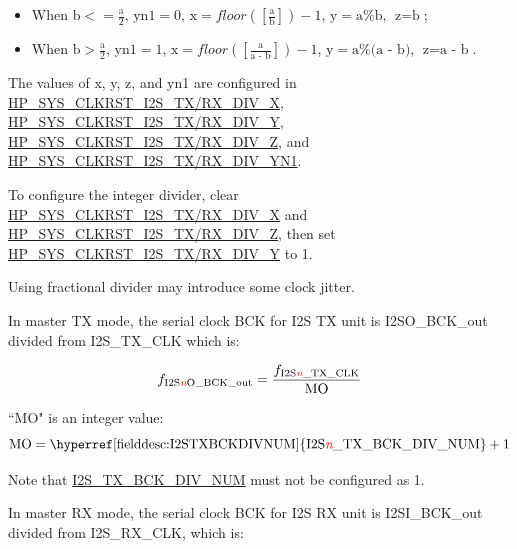 \documentclass[main\_\_EN.tex]{subfiles}
\begin{document}
\begin{itemize}
    \item When $\textrm{b} <= \frac{\textrm{a}}{2}$, $\textrm{yn1} = 0$, $\textrm{x} = floor([\frac{\textrm{a}}{\textrm{b}}]) - 1$, $\textrm{y} = \textrm{a}\%\textrm{b}$, $\textrm{z} = \textrm{b}$; 
    \item When $\textrm{b} > \frac{\textrm{a}}{2}$, $\textrm{yn1}=1$, $\textrm{x} = floor([\frac{\textrm{a}}{\textrm{a - b}}]) - 1$, $\textrm{y} = \textrm{a}\%\textrm{(a - b)}$, $\textrm{z}=\textrm{a - b}$.
\end{itemize}

The values of x, y, z, and yn1 are configured in \hyperref[fielddesc:HPSYSCLKRSTI2S0TXDIVX]{HP\_SYS\_CLKRST\_I2S\_TX/RX\_DIV\_X}, \hyperref[fielddesc:HPSYSCLKRSTI2S0TXDIVY]{HP\_SYS\_CLKRST\_I2S\_TX/RX\_DIV\_Y}, \hyperref[fielddesc:HPSYSCLKRSTI2S0TXDIVZ]{HP\_SYS\_CLKRST\_I2S\_TX/RX\_DIV\_Z}, and \hyperref[fielddesc:HPSYSCLKRSTI2S0TXDIVYN1]{HP\_SYS\_CLKRST\_I2S\_TX/RX\_DIV\_YN1}.

To configure the integer divider, clear \hyperref[fielddesc:HPSYSCLKRSTI2S0TXDIVX]{HP\_SYS\_CLKRST\_I2S\_TX/RX\_DIV\_X} and \hyperref[fielddesc:HPSYSCLKRSTI2S0TXDIVZ]{HP\_SYS\_CLKRST\_I2S\_TX/RX\_DIV\_Z}, then set \hyperref[fielddesc:HPSYSCLKRSTI2S0TXDIVY]{HP\_SYS\_CLKRST\_I2S\_TX/RX\_DIV\_Y} to 1.

\begin{tiplisting}
Using fractional divider may introduce some clock jitter.
\end{tiplisting}

In master TX mode, the serial clock BCK for I2S TX unit is I2SO\_BCK\_out divided from I2S\_TX\_CLK which is:

$$f_{\textrm{I2S\textcolor{red}{\it{n}}O\_BCK\_out}} = \frac{f_{\textrm{I2S\textcolor{red}{\it{n}}\_TX\_CLK}}}{\textrm{MO}}$$

``MO" is an integer value:
$$ \textrm{MO} = \textrm{\hyperref[fielddesc:I2STXBCKDIVNUM]{I2S\regindex{n}\_TX\_BCK\_DIV\_NUM}} + 1 $$

\vspace{-1em}
\begin{tiplisting}
Note that \hyperref[fielddesc:I2STXBCKDIVNUM]{I2S\_TX\_BCK\_DIV\_NUM} must not be configured as 1.
\end{tiplisting}

In master RX mode, the serial clock BCK for I2S RX unit is I2SI\_BCK\_out divided from I2S\_RX\_CLK, which is:
\end{document}
